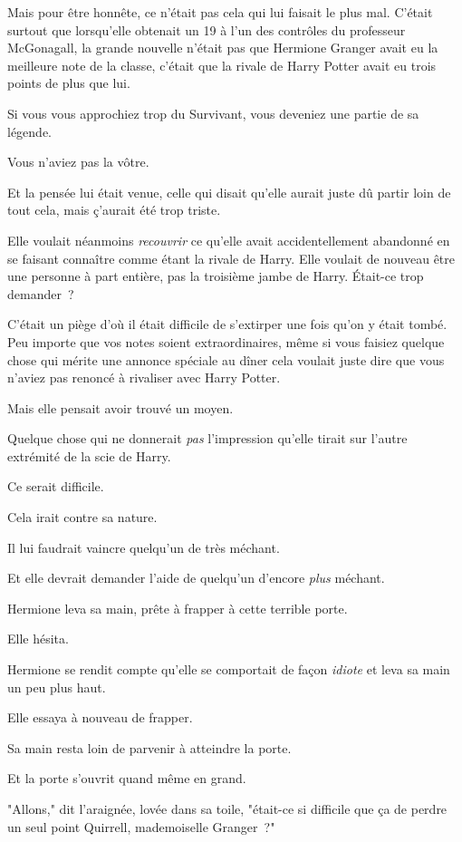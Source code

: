 Mais pour être honnête, ce n'était pas cela qui lui faisait le plus mal. C'était surtout que lorsqu'elle obtenait un 19 à l'un des contrôles du professeur McGonagall, la grande nouvelle n'était pas que Hermione Granger avait eu la meilleure note de la classe, c'était que la rivale de Harry Potter avait eu trois points de plus que lui.

Si vous vous approchiez trop du Survivant, vous deveniez une partie de sa légende.

Vous n'aviez pas la vôtre.

Et la pensée lui était venue, celle qui disait qu'elle aurait juste dû partir loin de tout cela, mais ç'aurait été trop triste.

Elle voulait néanmoins \emph{recouvrir} ce qu'elle avait accidentellement abandonné en se faisant connaître comme étant la rivale de Harry. Elle voulait de nouveau être une personne à part entière, pas la troisième jambe de Harry. Était-ce trop demander~?

C'était un piège d'où il était difficile de s'extirper une fois qu'on y était tombé. Peu importe que vos notes soient extraordinaires, même si vous faisiez quelque chose qui mérite une annonce spéciale au dîner cela voulait juste dire que vous n'aviez pas renoncé à rivaliser avec Harry Potter.

Mais elle pensait avoir trouvé un moyen.

Quelque chose qui ne donnerait \emph{pas} l'impression qu'elle tirait sur l'autre extrémité de la scie de Harry.

Ce serait difficile.

Cela irait contre sa nature.

Il lui faudrait vaincre quelqu'un de très méchant.

Et elle devrait demander l'aide de quelqu'un d'encore \emph{plus} méchant.

Hermione leva sa main, prête à frapper à cette terrible porte.

Elle hésita.

Hermione se rendit compte qu'elle se comportait de façon \emph{idiote} et leva sa main un peu plus haut.

Elle essaya à nouveau de frapper.

Sa main resta loin de parvenir à atteindre la porte.

Et la porte s'ouvrit quand même en grand.

"Allons," dit l'araignée, lovée dans sa toile, "était-ce si difficile que ça de perdre un seul point Quirrell, mademoiselle Granger~?"

